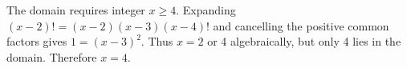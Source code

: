 The domain requires integer $ x\ge4 $. Expanding $(x-2)!=(x-2)(x-3)(x-4)!$ and cancelling the positive common factors gives $ 1=(x-3)^2 $. Thus $ x=2 $ or 4 algebraically, but only 4 lies in the domain. Therefore $\boxed{x=4}$.
